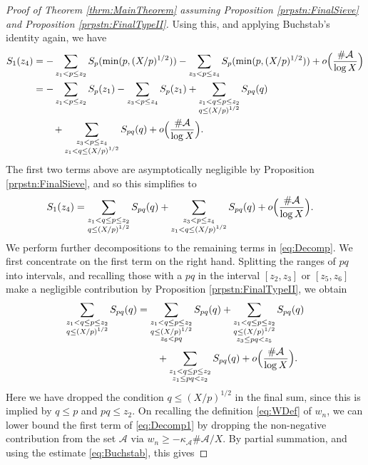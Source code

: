 \documentclass[10pt]{amsart}
\theoremstyle{plain}
\numberwithin{sblmm}{thrm}
\numberwithin{equation}{section}
\begin{document}
\begin{proof}[Proof of Theorem \ref{thrm:MainTheorem} assuming Proposition \ref{prpstn:FinalSieve} and Proposition \ref{prpstn:FinalTypeII}]
Using this, and applying Buchstab's identity again, we have
%
\begingroup
\allowdisplaybreaks
\begin{align*}
S_1(z_4)
&=-\sum_{z_1<p\le z_2}S_p(\min(p,(X/p)^{1/2}))
-\sum_{z_3<p\le z_4}S_p(\min(p,(X/p)^{1/2}))
+o\Bigl(\frac{\#\mathcal{A}{}}{\log{X}}\Bigr)\\
&=-\sum_{z_1<p\le z_2}S_p(z_1)
-\sum_{z_3<p\le z_4}S_p(z_1)
+\sum_{\substack{z_1<q\le p\le z_2\\ q\le (X/p)^{1/2}}}S_{p q}(q)\\
&\qquad+\sum_{\substack{z_3<p\le z_4 \\ z_1<q\le (X/p)^{1/2}}}S_{p q}(q)+o\Bigl(\frac{\#\mathcal{A}{}}{\log{X}}\Bigr).
\end{align*}
\endgroup
%
The first two terms above are asymptotically negligible by Proposition \ref{prpstn:FinalSieve}, and so this simplifies to
%
\begin{align}
S_1(z_4)
&=\sum_{\substack{z_1<q\le p\le z_2\\ q\le (X/p)^{1/2}}}S_{p q}(q)+\sum_{\substack{z_3<p\le z_4 \\ z_1<q\le (X/p)^{1/2}}}S_{p q}(q)+o\Bigl(\frac{\#\mathcal{A}{}}{\log{X}}\Bigr).
\label{eq:Decomp}
\end{align}
%
We perform further decompositions to the remaining terms in \eqref{eq:Decomp}. We first concentrate on the first term on the right hand. Splitting the ranges of $p q$ into intervals, and recalling those with a $p q$ in the interval $[z_2,z_3]$ or $[z_5,z_6]$ make a negligible contribution by Proposition \ref{prpstn:FinalTypeII}, we obtain
%
\begin{align}
\sum_{\substack{z_1<q\le p\le z_2\\ q\le (X/p)^{1/2}}}S_{p q}(q)
&=\sum_{\substack{z_1<q\le p\le z_2\\ q\le (X/p)^{1/2}\\ z_6< p q}}S_{p q}(q)
+\sum_{\substack{z_1<q\le p\le z_2\\ q\le (X/p)^{1/2}\\ z_3\le p q<z_5}}S_{p q}(q)\nonumber\\
&\qquad+\sum_{\substack{z_1<q\le p\le z_2\\ z_1\le p q<z_2}}S_{p q}(q)+o\Bigl(\frac{\#\mathcal{A}{}}{\log{X}}\Bigr).
\label{eq:Decomp1}
\end{align}
Here we have dropped the condition $q\le (X/p)^{1/2}$ in the final sum, since this is implied by $q\le p$ and $p q\le z_2$.
%
On recalling the definition \eqref{eq:WDef} of $w_n$, we can lower bound the first term of \eqref{eq:Decomp1} by dropping the non-negative contribution from the set $\mathcal{A}{}$ via $w_n\ge -\kappa_{\mathcal{A}}\#\mathcal{A}{}/X$. By partial summation, and using the estimate \eqref{eq:Buchstab}, this gives

\end{proof}
\end{document}
